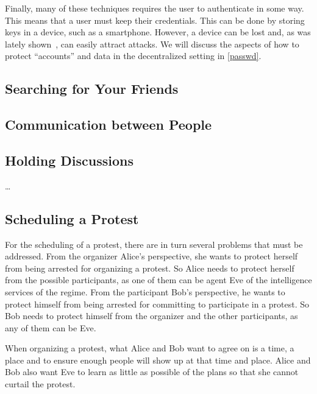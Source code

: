 Finally, many of these techniques requires the user to authenticate in some 
way.
This means that a user must keep their credentials.
This can be done by storing keys in a device, such as a smartphone.
However, a device can be lost and, as was lately shown~\cite{AppleVsFBI}, can 
easily attract attacks.
We will discuss the aspects of how to protect \enquote{accounts} and data in 
the decentralized setting in \cref{passwd}.

\subsection{Searching for Your Friends}
\label{UserSearch}





\subsection{Communication between People}
\label{Communicating}



\subsection{Holding Discussions}
\label{Discussions}

\citet{multiotr2009} \dots



\subsection{Scheduling a Protest}
\label{Scheduling}

For the scheduling of a protest, there are in turn several problems that must 
be addressed.
From the organizer Alice's perspective, she wants to protect herself from being 
arrested for organizing a protest.
So Alice needs to protect herself from the possible participants, as one of 
them can be agent Eve of the intelligence services of the regime.
From the participant Bob's perspective, he wants to protect himself from being 
arrested for committing to participate in a protest.
So Bob needs to protect himself from the organizer and the other participants, 
as any of them can be Eve.

When organizing a protest, what Alice and Bob want to agree on is a time, 
a place and to ensure enough people will show up at that time and place.
Alice and Bob also want Eve to learn as little as possible of the plans so 
that she cannot curtail the protest.

